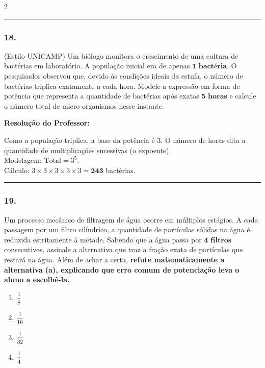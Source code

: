 \begin{multicols*}{2}
\par\vspace{\espacoQuestao}

\noindent\textcolor{CorLinha}{\rule{\linewidth}{0.5pt}} 
\par\vspace{\espacoPreQuestao}
\subsubsection*{18.} (Estilo UNICAMP) Um biólogo monitora o crescimento de uma cultura de bactérias em laboratório. A população inicial era de apenas $ \textbf{1 bactéria} $. O pesquisador observou que, devido às condições ideais da estufa, o número de bactérias triplica exatamente a cada hora. Modele a expressão em forma de potência que representa a quantidade de bactérias após exatas $ \textbf{5 horas} $ e calcule o número total de micro-organismos nesse instante.

\ifgabarito
    \begin{tcolorbox}[colback=CorTitUm!5, colframe=CorTitUm, boxrule=1pt, arc=4pt, left=6pt, right=6pt, top=6pt, bottom=6pt]
    \small\textbf{\textcolor{CorTitUm}{Resolução do Professor:}}\par\vspace{0.1cm}
    \color{CinzaEscuro}
    Como a população triplica, a base da potência é 3. O número de horas dita a quantidade de multiplicações sucessivas (o expoente).\\
    Modelagem: $ \text{Total} = 3^{5} $.\\
    Cálculo: $ 3 \times 3 \times 3 \times 3 \times 3 = \textbf{243} $ bactérias.
    \end{tcolorbox}
\fi

\par\vspace{\espacoQuestao}

\noindent\textcolor{CorLinha}{\rule{\linewidth}{0.5pt}} 
\par\vspace{\espacoPreQuestao}
\subsubsection*{19.} Um processo mecânico de filtragem de água ocorre em múltiplos estágios. A cada passagem por um filtro cilíndrico, a quantidade de partículas sólidas na água é reduzida estritamente à metade. Sabendo que a água passa por $ \textbf{4 filtros} $ consecutivos, assinale a alternativa que traz a fração exata de partículas que restará na água. Além de achar a certa, \textbf{refute matematicamente a alternativa (a), explicando que erro comum de potenciação leva o aluno a escolhê-la.}
\begin{enumerate}[label=\alph*), itemsep=\espacoAlt]
    \item $ \mfrac{1}{8} $
    \item $ \mfrac{1}{16} $
    \item $ \mfrac{1}{32} $
    \item $ \mfrac{1}{4} $
\end{enumerate}


\end{multicols*}
